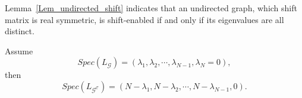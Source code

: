 \documentclass[journal]{IEEEtran}
\begin{document}
Lemma~\ref{Lem_undirected_shift} indicates that an undirected graph, which shift matrix is real symmetric, is shift-enabled if and only if its eigenvalues are all distinct.
\begin{Lem}{\label{Lem_spec_complement}}{\rm{\cite{Merris1994Laplacian}}}
	Assume 
	\begin{equation*}
	Spec(L_{\mathcal{G}})=(\lambda_1, \lambda_2, \cdots, \lambda_{N-1},\lambda_N=0),
	\end{equation*}
	then
	\begin{equation*}
	Spec(L_{\mathcal{G^C}})=(N-\lambda_1, N-\lambda_2,  \cdots,N-\lambda_{N-1}, 0).
	\end{equation*} 
\end{Lem}
\end{document}
